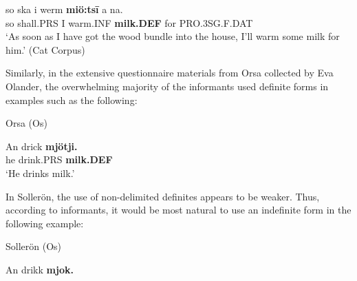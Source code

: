  \ea\label{}
\gll so  ska  i  werm  \textbf{miö:ts\={i}} a  na.\\


so  shall.PRS  I  warm.INF  \textbf{milk.DEF} for  PRO.3SG.F.DAT\\

\glt  ‘As soon as I have got the wood bundle into the house, I’ll warm some milk for him.’ (Cat Corpus)

\z

Similarly, in the extensive questionnaire materials from Orsa collected by Eva Olander, the overwhelming majority of the informants used definite forms in examples such as the following:


\item 

Orsa (Os)



 \ea\label{}
\gll An  drick  \textbf{mjötji.}\\


he  drink.PRS  \textbf{milk.DEF}\\

\glt ‘He drinks milk.’

\z

In Sollerön, the use of non-delimited definites appears to be weaker. Thus, according to informants, it would be most natural to use an indefinite form in the following example:


\item 

Sollerön (Os) 



 \ea\label{}
\gll An  drikk  \textbf{mjok.}\\



